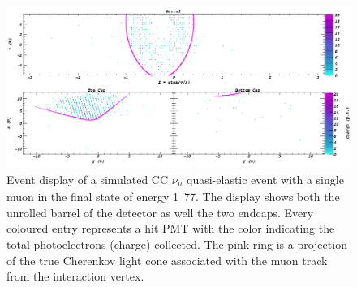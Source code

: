 \begin{figure} %
    \includegraphics[width=\textwidth]{diagrams/4-chips/sim_event.png}
    \caption[Event display of a simulated beam CC $\nu_{\mu}$ \chipsfive event]
    {Event display of a simulated CC $\nu_{\mu}$ quasi-elastic event with a single muon in the
        final state of energy \unit{1.77}{\GeV}. The display shows both the unrolled barrel of the
        \chipsfive detector as well the two endcaps. Every coloured entry represents a hit PMT
        with the color indicating the total photoelectrons (charge) collected. The pink ring is a
        projection of the true Cherenkov light cone associated with the muon track from the
        interaction vertex.}
    \label{fig:sim_event}
\end{figure}